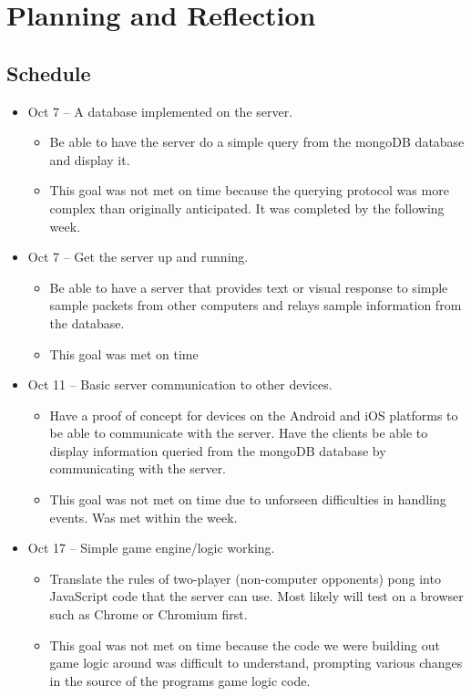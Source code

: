 \documentclass[letterpaper,12pt]{article}
\begin{document}
\section{Planning and Reflection}
\subsection{Schedule}
\begin{itemize}
	\item Oct 7 -- A database implemented on the server.
	\begin{itemize}
		\item  Be able to have the server do a simple query from the mongoDB database and display it.
		\item This goal was not met on time because the querying protocol was more complex than originally anticipated. It was completed by the following week.
	\end{itemize}
	\item Oct 7 -- Get the server up and running. 
	\begin{itemize}
		\item Be able to have a server that provides text or visual response to simple sample packets from other computers and relays sample information from the database.
		\item This goal was met on time
	\end{itemize}
	\item Oct 11 -- Basic server communication to other devices. 
	\begin{itemize}
		\item Have a proof of concept for devices on the Android and iOS platforms to be able to communicate with the server. Have the clients be able to display information queried from the mongoDB database by communicating with the server.
		\item This goal was not met on time due to unforseen difficulties in handling events. Was met within the week.
	\end{itemize}
	\item Oct 17 -- Simple game engine/logic working.
	\begin{itemize}
		\item Translate the rules of two-player (non-computer opponents) pong into JavaScript code that the server can use. Most likely will test on a browser such as Chrome or Chromium first.
		\item This goal was not met on time because the code we were building out game logic around was difficult to understand, prompting various changes in the source of the programs game logic code.

\end{itemize}
\end{itemize}
\end{document}
